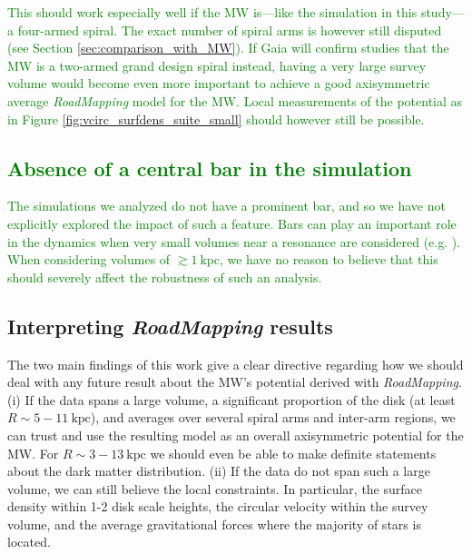 \documentclass[iop,revtex4,numberedappendix,appendixfloats]{emulateapj}
\newcommand{\RM}{{\sl RoadMapping}}
\newcommand{\NEW}[1]{\textcolor{Green}{#1}}
\newcommand{\OLD}[1]{}
\begin{document}
\NEW{This should work especially well if the MW is---like the simulation in this study---a four-armed spiral. The exact number of spiral arms is however still disputed (see Section \ref{sec:comparison_with_MW}). If Gaia will confirm studies that the MW is a two-armed grand design spiral instead, having a very large survey volume would become even more important to achieve a good axisymmetric average \RM{} model for the MW. Local measurements of the potential as in Figure \ref{fig:vcirc_surfdens_suite_small} should however still be possible.}

\OLD{Overall, we expect that the MW spiral arms within a few kiloparsecs around the Sun are weaker than the arms in this galaxy simulation. \citet{2014ApJ...783..130R} measured, for example, that typical peculiar non-circular motions in the MW spiral arms were around $10-20~\text{km s}^{-1}$ for $R \gtrsim 4~\text{kpc}$, while Figure \ref{fig:DF_velres} suggests an excess of stars with radial velocities up to $50~\text{km s}^{-1}$ in our simulated galaxy.}

\subsection{\NEW{Absence of a central bar in the simulation}}

\NEW{The simulations we analyzed do not have a prominent bar, and so we have not explicitly explored the impact of such a feature. Bars can play an important role in the dynamics when very small volumes near a resonance are considered (e.g. \citealt{2000AJ....119..800D}). When considering volumes of $\gtrsim 1~\text{kpc}$, we have no reason to believe that this should severely affect the robustness of such an analysis.}

\subsection{Interpreting \RM{} results}

The two main findings of this work give a clear directive regarding how we should deal with any future result about the MW's potential derived with \RM{}. (i) If the data spans a large volume, a significant proportion of the disk (at least $R\sim 5-11~\text{kpc}$), and averages over several spiral arms and inter-arm regions, we can trust and use the resulting model as an overall axisymmetric potential for the MW. For $R\sim 3-13~\text{kpc}$ we should even be able to make definite statements about the dark matter distribution. (ii) If the data do not span such a large volume, we can still believe the local constraints. In particular, the surface density within 1-2 disk scale heights, the circular velocity within the survey volume, and the average gravitational forces where the majority of stars is located.
\end{document}
